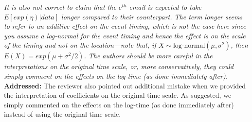 \documentclass[12pt]{article}
\newcommand{\grey}[1]{{\color{mygrey}#1}}
\theoremstyle{definition}
\begin{document}
 \grey{\emph{It is also not correct to claim that the $e^{th}$ email is expected to take $E[exp(\eta) | data]$ longer compared to their counterpart. The term longer seems to refer to an additive effect on the event timing, which is not the case here since you assume a log-normal for the event timing and hence the effect is on the scale of the timing and not on the location---note that, if $X \sim \text{log-normal}(\mu, \sigma^2)$, then $E(X) = exp(\mu + \sigma^2/2)$. The authors should be more careful in the interpretations on the original time scale, or, more conservatively, they could simply comment on the effects on the log-time (as done immediately after).}}\\

\noindent \textcolor{MyGreen}{\textbf{Addressed:}} The reviewer also pointed out additional mistake when we provided the interpretation of coefficients on the original time scale. As suggested, we simply commented on the effects on the log-time (as done immediately after) instead of using the original time scale.\\
\end{document}
